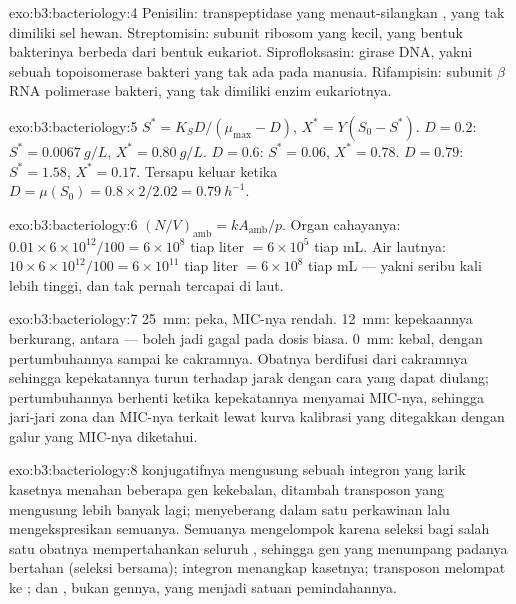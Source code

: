 \begin{solution}{exo:b3:bacteriology:4}
Penisilin: transpeptidase yang menaut-silangkan , yang tak
dimiliki sel hewan. Streptomisin: subunit ribosom yang kecil,
yang bentuk bakterinya berbeda dari bentuk eukariot. Siprofloksasin: girase
DNA, yakni sebuah topoisomerase bakteri yang tak ada pada manusia. Rifampisin:
subunit $\beta$ RNA polimerase bakteri, yang tak dimiliki
enzim eukariotnya.
\end{solution}

\begin{solution}{exo:b3:bacteriology:5}
$S^{*} = K_{S}D/(\mu_{\max} - D)$, $X^{*} = Y(S_{0} - S^{*})$. $D = 0.2$:
$S^{*} = \qty{0.0067}{g/L}$, $X^{*} = \qty{0.80}{g/L}$. $D = 0.6$:
$S^{*} = 0.06$, $X^{*} = 0.78$. $D = 0.79$: $S^{*} = 1.58$, $X^{*} = 0.17$.
Tersapu keluar ketika $D = \mu(S_{0}) = 0.8\times 2/2.02 = \qty{0.79}{h^{-1}}$.
\end{solution}

\begin{solution}{exo:b3:bacteriology:6}
$(N/V)_{\text{amb}} = kA_{\text{amb}}/p$. Organ cahayanya: $0.01\times
6\times 10^{12}/100 = 6\times 10^{8}$ tiap liter $= 6\times 10^{5}$ tiap
mL. Air lautnya: $10\times 6\times 10^{12}/100 = 6\times 10^{11}$ tiap liter
$= 6\times 10^{8}$ tiap mL --- yakni seribu kali lebih tinggi, dan tak pernah
tercapai di laut.
\end{solution}

\begin{solution}{exo:b3:bacteriology:7}
\qty{25}{mm}: peka, MIC-nya rendah. \qty{12}{mm}: kepekaannya berkurang,
antara --- boleh jadi gagal pada dosis biasa. \qty{0}{mm}: kebal, dengan
pertumbuhannya sampai ke cakramnya. Obatnya berdifusi dari cakramnya sehingga
kepekatannya turun terhadap jarak dengan cara yang dapat diulang;
pertumbuhannya berhenti ketika kepekatannya menyamai MIC-nya, sehingga
jari-jari zona dan MIC-nya terkait lewat kurva kalibrasi yang ditegakkan dengan
galur yang MIC-nya diketahui.
\end{solution}

\begin{solution}{exo:b3:bacteriology:8}
 konjugatifnya mengusung sebuah integron yang larik kasetnya menahan
beberapa gen kekebalan, ditambah transposon yang mengusung lebih banyak lagi;
 menyeberang dalam satu perkawinan lalu mengekspresikan semuanya.
Semuanya mengelompok karena seleksi bagi salah satu obatnya mempertahankan
seluruh , sehingga gen yang menumpang padanya bertahan (seleksi
bersama); integron menangkap kasetnya; transposon melompat ke ; dan
, bukan gennya, yang menjadi satuan pemindahannya.
\end{solution}

